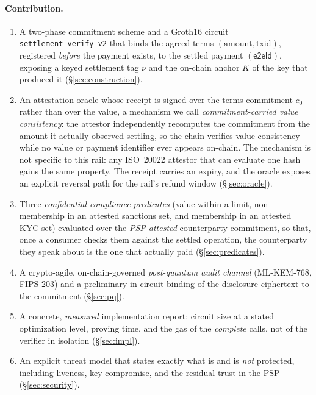 \documentclass[11pt]{article}
\newcommand{\eeid}{\ensuremath{\mathsf{e2eId}}}
\newcommand{\code}[1]{\texttt{#1}}
\begin{document}
\paragraph{Contribution.}
\begin{enumerate}
\item A two-phase commitment scheme and a Groth16 circuit
\code{settlement\_verify\_v2} that binds the agreed terms $(\text{amount},
\text{txid})$, registered \emph{before} the payment exists, to the settled
payment $(\eeid)$, exposing a keyed settlement tag $\nu$ and the on-chain anchor
$K$ of the key that produced it (\S\ref{sec:construction}).
\item An attestation oracle whose receipt is signed over the terms commitment
$c_0$ rather than over the value, a mechanism we call \emph{commitment-carried
value consistency}: the attestor independently recomputes the commitment from
the amount it actually observed settling, so the chain verifies value
consistency while no value or payment identifier ever appears on-chain. The
mechanism is not specific to this rail: any ISO~20022 attestor that can
evaluate one hash gains the same property. The receipt carries an expiry, and
the oracle exposes an explicit reversal path for the rail's refund window
(\S\ref{sec:oracle}).
\item Three \emph{confidential compliance predicates} (value within a limit,
non-membership in an attested sanctions set, and membership in an attested KYC
set) evaluated over the \emph{PSP-attested} counterparty commitment, so that,
once a consumer checks them against the settled operation, the counterparty
they speak about is the one that actually paid (\S\ref{sec:predicates}).
\item A crypto-agile, on-chain-governed \emph{post-quantum audit channel}
(ML-KEM-768, FIPS-203) and a preliminary in-circuit binding of the disclosure
ciphertext to the commitment (\S\ref{sec:pq}).
\item A concrete, \emph{measured} implementation report: circuit size at a stated
optimization level, proving time, and the gas of the \emph{complete} calls, not
of the verifier in isolation (\S\ref{sec:impl}).
\item An explicit threat model that states exactly what is and is \emph{not}
protected, including liveness, key compromise, and the residual trust in the PSP
(\S\ref{sec:security}).
\end{enumerate}
\end{document}
